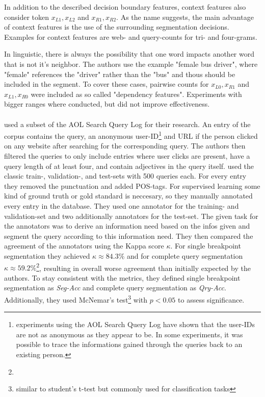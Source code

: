 In addition to the described decision boundary features, context features also consider token $x_{L1}, x_{L2}$ and $x_{R1}, x_{R2}$. As the name suggests, the main advantage of context features is the use of the surrounding segmentation decisions. Examples for context features are web- and query-counts for tri- and four-grams.

In linguistic, there is always the possibility that one word impacts another word that is not it's neighbor. The authors use the example "female bus driver", where "female" references the "driver" rather than the "bus" and thous should be included in the segment. To cover these cases, pairwise counts for $x_{L0},x_{R1}$ and $x_{L1},x_{R0}$ were included as so called "dependency features". Experiments with bigger ranges where conducted, but did not improve effectiveness.\\
\\
\citeauthor{Bergsma:2007} used a subset of the AOL Search Query Log \cite{Pass:2006} for their research. An entry of the corpus contains the query, an anonymous user-ID\footnote{experiments using the AOL Search Query Log have shown that the user-IDs are not as anonymous as they appear to be. In some experiments, it was possible to trace the informations gained through the queries back to an existing person.} and URL if the person clicked on any website after searching for the corresponding query.
The authors then filtered the queries to only include entries where user clicks are present, have a query length of at least four, and contain adjectives in the query itself.
\citeauthor{Bergsma:2007} used the classic train-, validation-, and test-sets with 500 queries each. For every entry they removed the punctuation and added POS-tags. For supervised learning some kind of ground truth or gold standard is neccesary, so they manually annotated every entry in the database. They used one annotator for the training- and validation-set and two additionally annotators for the test-set. The given task for the annotators was to derive an information need based on the infos given and segment the query according to this information need. They then compared the agreement of the annotators using the Kappa score $\kappa$. For single breakpoint segmentation they achieved $\kappa \approx 84.3\%$ and for complete query segmentation $\kappa \approx 59.2\%$\footnote{}, resulting in overall worse agreement than initially expected by the authors.
To stay consistent with the metrics, they defined single breakpoint segmentation as \textit{Seg-Acc} and complete query segmentation as \textit{Qry-Acc}. Additionally, they used McNemar's test\footnote{similar to student's t-test but commonly used for classification tasks} with $p<0.05$ to assess significance.

